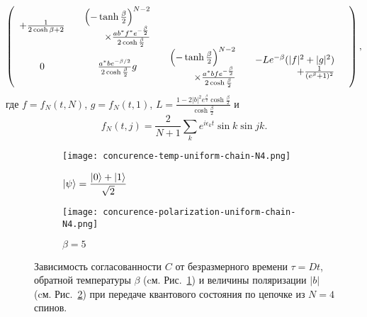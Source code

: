 \begin{equation}
\begin{pmatrix}
\begin{array}{r}
    +\frac{1}{2\cosh{\beta}+2}
  \end{array}
  &
  \begin{array}{r}
    \left( -\tanh\frac{\beta}{2} \right)^{N-2} \\
    \times \frac{ab^*f^* e^{-\frac{\beta}{2}}}{2\cosh\frac{\beta}{2}}
  \end{array}
  &
  &
  &\\
  0
  &
  \frac{a^*b e^{-\beta /2}}{2\cosh\frac{\beta}{2}}g
  &
  \begin{array}{r}
    \left( -\tanh\frac{\beta}{2} \right) ^{N-2} \\
    \times \frac{a^*bf e^{-\frac{\beta}{2}}}{2\cosh\frac{\beta}{2}}
  \end{array}
  &
  \begin{array}{r}
    -L e^{-\beta}(|f|^2 +|g|^2)\\
    + \frac{1}{(e^{\beta}+1)^2}
  \end{array}
\end{pmatrix},
\end{equation}
\normalsize
где $f={f_N(t, N)}$, $g={f_N(t, 1)}$, $L=\frac{1-2|b|^2 e^{\frac{\beta}{2}}\cosh\frac{\beta}{2}}{\cosh\frac{\beta}{2}}$
и
%
\begin{equation}
  f_N(t, j) = \frac{2}{N+1}\sum_k e^{i\epsilon_k t}\sin k \sin jk.
\end{equation}

\begin{figure}[H]
  \begin{subfigure}{0.45\textwidth}
    \texttt{[image: concurence-temp-uniform-chain-N4.png]}
    \caption{
      $\left| \psi \right\rangle = \dfrac{\left| 0 \right\rangle + \left| 1 \right\rangle}{\sqrt{2}}$
    }
    \label{fig:concurence-temp-uniform-chain-N4}
  \end{subfigure}
  \hfill
  \begin{subfigure}{0.45\textwidth}
    \texttt{[image: concurence-polarization-uniform-chain-N4.png]}
    \caption{
      $\beta = 5$
    }
    \label{fig:concurence-polarization-uniform-chain-N4}
  \end{subfigure}
  \caption{
    Зависимость согласованности $C$ от безразмерного времени $\tau = Dt$,
    обратной температуры $\beta$
    (cм. Рис.~\ref{fig:concurence-temp-uniform-chain-N4})
    и величины поляризации $|b|$
    (cм. Рис.~\ref{fig:concurence-polarization-uniform-chain-N4})
    при передаче квантового состояния по цепочке из $N=4$ спинов.
  }
  \label{fig:councurence-uniform-chain-N4}
\end{figure}

